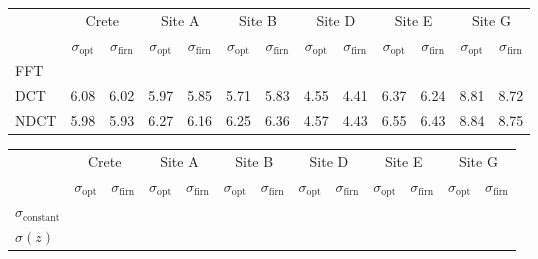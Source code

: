 \documentclass[../../CompleteThesis/Complete_1stDraft]{subfiles}
\begin{document}
	
	
\begin{table}[ht]
	\centering
	\begin{tabular}{l||*{6}{c | c||}}
		&
		\multicolumn{2}{c}{Crete} & \multicolumn{2}{c}{Site A} & \multicolumn{2}{c}{Site B} & \multicolumn{2}{c}{Site D} & \multicolumn{2}{c}{Site E} & \multicolumn{2}{c||}{Site G} \\
		&
		$\sigma_{\text{opt}}$ & $\sigma_{\text{firn}}$ & $\sigma_{\text{opt}}$ & $\sigma_{\text{firn}}$ & $\sigma_{\text{opt}}$ & $\sigma_{\text{firn}}$ & $\sigma_{\text{opt}}$ & $\sigma_{\text{firn}}$ & $\sigma_{\text{opt}}$ & $\sigma_{\text{firn}}$ & $\sigma_{\text{opt}}$ & $\sigma_{\text{firn}}$ \\
		
		\hline
		FFT & & & & & & & & & & & & \\ 
		DCT & 6.08 & 6.02 & 5.97 & 5.85 & 5.71 & 5.83 & 4.55 & 4.41 & 6.37 & 6.24 & 8.81 & 8.72 \\
		NDCT & 5.98 & 5.93 & 6.27 & 6.16 & 6.25 & 6.36 & 4.57 & 4.43 & 6.55 & 6.43 & 8.84 & 8.75 \\
	\end{tabular}
\end{table}

\begin{table}[ht]
	\centering
	\begin{tabular}{l||*{6}{c | c||}}
		&
		\multicolumn{2}{c}{Crete} & \multicolumn{2}{c}{Site A} & \multicolumn{2}{c}{Site B} & \multicolumn{2}{c}{Site D} & \multicolumn{2}{c}{Site E} & \multicolumn{2}{c||}{Site G} \\
		&
		$\sigma_{\text{opt}}$ & $\sigma_{\text{firn}}$ & $\sigma_{\text{opt}}$ & $\sigma_{\text{firn}}$ & $\sigma_{\text{opt}}$ & $\sigma_{\text{firn}}$ & $\sigma_{\text{opt}}$ & $\sigma_{\text{firn}}$ & $\sigma_{\text{opt}}$ & $\sigma_{\text{firn}}$ & $\sigma_{\text{opt}}$ & $\sigma_{\text{firn}}$ \\
		
		\hline
		$\sigma_{\text{constant}}$ & & & & & & & & & & & & \\ 
		$\sigma(z)$ & & & & & & & & & & & & \\ 
	\end{tabular}
\end{table}
\end{document}
